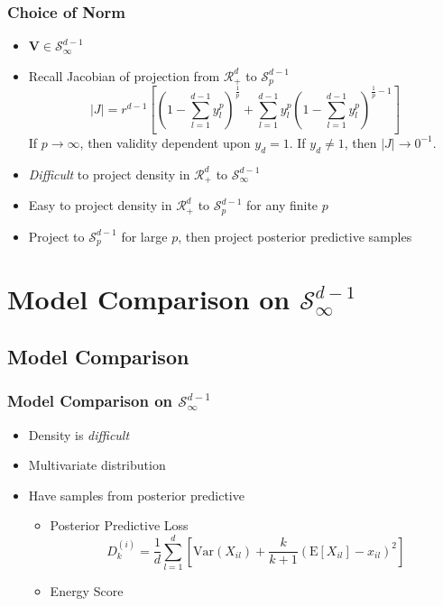 \documentclass[aspectratio=169]{beamer}
\begin{document}
\begin{frame}
  \frametitle{Choice of Norm}
  \begin{itemize}
    \item $\bm{V} \in \mathcal{S}_{\infty}^{d-1}$
    \pause
    \item Recall Jacobian of projection from $\mathcal{R}_+^d$ to $\mathcal{S}_{p}^{d-1}$
    \begin{equation*}
        \lvert J \rvert = r^{d-1}\left[\left(1 - {\textstyle\sum}_{l = 1}^{d-1}y_l^p\right)^{\frac{1}{p}} +
        {\textstyle\sum}_{l = 1}^{d-1}y_l^p\left(1 - {\textstyle\sum}_{l=1}^{d-1}
              y_l^p\right)^{\frac{1}{p} - 1}\right]
    \end{equation*}
    \pause
    If $p\to\infty$, then validity dependent upon $y_d = 1$.  If $y_d\neq 1$, then $\lvert J \rvert \to 0^{-1}$.
    \pause
    \item \emph{Difficult} to project density in $\mathcal{R}_+^{d}$ to $\mathcal{S}_{\infty}^{d-1}$
    \pause
    \item Easy to project density in $\mathcal{R}_+^{d}$ to $\mathcal{S}_{p}^{d-1}$ for any finite $p$
    \pause
    \item Project to $\mathcal{S}_{p}^{d-1}$ for large $p$, then project posterior predictive samples
  \end{itemize}
\end{frame}

\section[Model Comparison]{Model Comparison on $\mathcal{S}_{\infty}^{d-1}$}
\subsection{Model Comparison}
\begin{frame}
  \frametitle{Model Comparison on $\mathcal{S}_{\infty}^{d-1}$}
  \begin{itemize}
      \item Density is \emph{difficult}
      \item Multivariate distribution
      \item Have samples from posterior predictive
      \begin{itemize}
            \item Posterior Predictive Loss~\citep{gelfand1998}
                \begin{equation*}
                    D_k^{(i)} = \frac{1}{d}\sum_{l = 1}^{d}\left[\text{Var}(X_{il}) +
                        \frac{k}{k+1}\left(\text{E}[X_{il}] - x_{il}\right)^2\right]
                \end{equation*}
            \item Energy Score~\cite{gneiting2007}
      \end{itemize}
  \end{itemize}
\end{frame}
\end{document}
